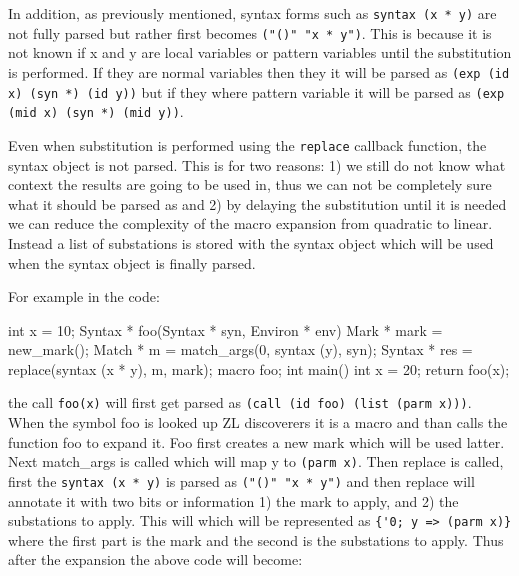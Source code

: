 \documentclass[12pt,english,letterpaper]{article}
\begin{document}
In addition, as previously mentioned, syntax forms such as
\verb/syntax (x * y)/ are not fully parsed but rather first becomes
\verb/("()" "x * y")/.  This is because it is not known if x and y are
local variables or pattern variables until the substitution is
performed.  If they are normal variables then they it will be parsed as
\verb/(exp (id x) (syn *) (id y))/ but if they where pattern variable it will be
parsed as \verb/(exp (mid x) (syn *) (mid y))/.

Even when substitution is performed using the \verb/replace/ callback
function, the syntax object is not parsed.  This is for two reasons: 1)
we still do not know what context the results are going to be used in,
thus we can not be completely sure what it should be
parsed as and 2) by delaying the substitution until it is needed we
can reduce the complexity of the macro expansion from quadratic to
linear.  Instead a list of substations is stored with the syntax
object which will be used when the syntax object is finally parsed.

For example in the code:

\begin{code}
int x = 10;
Syntax * foo(Syntax * syn, Environ * env) {
  Mark * mark = new_mark();
  Match * m = match_args(0, syntax (y), syn);
  Syntax * res = replace(syntax (x * y), m, mark);
}
macro foo;
int main() {
  int x = 20;
  return foo(x);
}
\end{code}

the call \verb/foo(x)/ will first get parsed as
\verb/(call (id foo) (list (parm x)))/.  When the symbol foo is looked
up ZL discoverers it is a macro and than calls the function foo to
expand it.  Foo first creates a new mark which will be used latter.
Next match\_args is called which will map y to \verb/(parm x)/.  Then
replace is called, first the \verb/syntax (x * y)/ is parsed as
\verb/("()" "x * y")/ and then replace will annotate it with two bits
or information 1) the mark to apply, and 2) the substations to apply.
This will which will be represented as \verb/{'0; y => (parm x)}/
where the first part is the mark and the second is the substations to
apply.  Thus after the expansion the above code will become:

\end{document}
